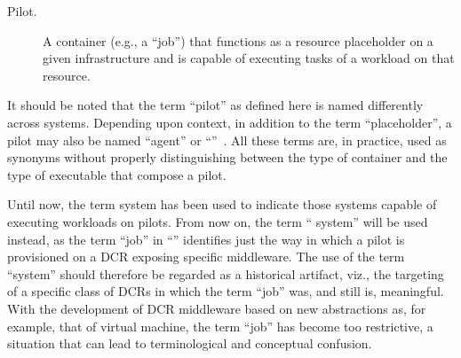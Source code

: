 \documentclass{sig-alternate}
\begin{document}

\begin{description}

\item[Pilot.] A container (e.g., a ``job'') that functions as a resource
placeholder on a given infrastructure and is capable of executing tasks of a
workload on that resource.

\end{description}

It should be noted that the term ``pilot'' as defined here is named differently
across \pilotjob systems. Depending upon context, in addition to the term
``placeholder'', a pilot may also be named ``agent'' or
``\pilotjob''~\cite{moscicki2011,pinchak2002}. All these terms are, in practice,
used as synonyms without properly distinguishing between the type of container
and the type of executable that compose a pilot.



Until now, the term \pilotjob system has been used to indicate those systems
capable of executing workloads on pilots. From now on, the term ``\pilot
system'' will be used instead, as the term ``job'' in ``\pilotjob'' identifies
just the way in which a pilot is provisioned on a DCR exposing specific
middleware. The use of the term ``\pilotjob system'' should therefore be
regarded as a historical artifact, viz., the targeting of a specific class of
DCRs in which the term ``job'' was, and still is, meaningful. With the
development of DCR middleware based on new abstractions as, for example, that of
virtual machine, the term ``job'' has become too restrictive, a situation that
can lead to terminological and conceptual confusion.
\end{document}

